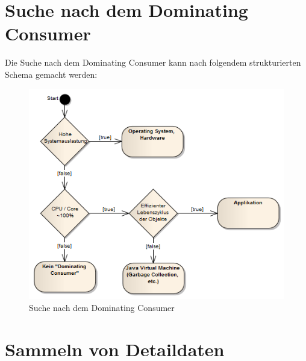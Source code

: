\section{Suche nach dem Dominating Consumer}
Die Suche nach dem Dominating Consumer kann nach folgendem strukturierten Schema gemacht werden:
\begin{figure}[H]
  	\centering
    	\includegraphics[width=13.1cm]{images/dominating_consumer}
        	\caption{Suche nach dem Dominating Consumer}
\end{figure}



\section{Sammeln von Detaildaten}

